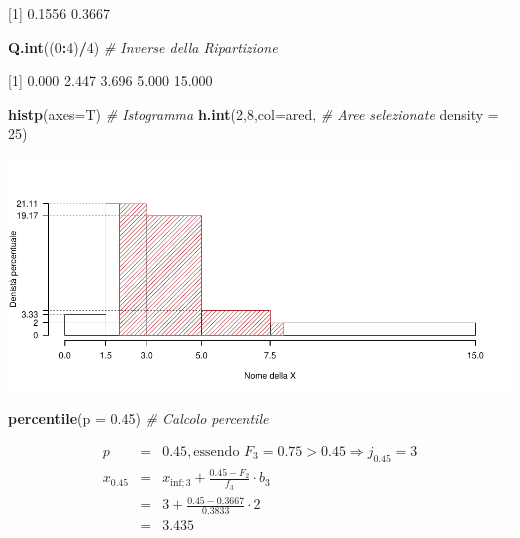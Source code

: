 \documentclass[
  11pt,
]{book}
\newenvironment{Shaded}{\begin{snugshade}}{\end{snugshade}}
\newcommand{\AttributeTok}[1]{\textcolor[rgb]{0.13,0.29,0.53}{#1}}
\newcommand{\CommentTok}[1]{\textcolor[rgb]{0.56,0.35,0.01}{\textit{#1}}}
\newcommand{\DecValTok}[1]{\textcolor[rgb]{0.00,0.00,0.81}{#1}}
\newcommand{\FloatTok}[1]{\textcolor[rgb]{0.00,0.00,0.81}{#1}}
\newcommand{\FunctionTok}[1]{\textcolor[rgb]{0.13,0.29,0.53}{\textbf{#1}}}
\newcommand{\NormalTok}[1]{#1}
\newcommand{\SpecialCharTok}[1]{\textcolor[rgb]{0.81,0.36,0.00}{\textbf{#1}}}
\theoremstyle{mytheoremstyle}
\theoremstyle{mydefstyle}
\begin{document}
{[}1{]} 0.1556 0.3667

\begin{Shaded}
\begin{Highlighting}[]
\FunctionTok{Q.int}\NormalTok{((}\DecValTok{0}\SpecialCharTok{:}\DecValTok{4}\NormalTok{)}\SpecialCharTok{/}\DecValTok{4}\NormalTok{)        }\CommentTok{\# Inverse della Ripartizione}
\end{Highlighting}
\end{Shaded}

{[}1{]} 0.000 2.447 3.696 5.000 15.000

\begin{Shaded}
\begin{Highlighting}[]
\FunctionTok{histp}\NormalTok{(}\AttributeTok{axes=}\NormalTok{T)         }\CommentTok{\# Istogramma}
\FunctionTok{h.int}\NormalTok{(}\DecValTok{2}\NormalTok{,}\DecValTok{8}\NormalTok{,}\AttributeTok{col=}\NormalTok{ared,   }\CommentTok{\# Aree selezionate}
      \AttributeTok{density =} \DecValTok{25}\NormalTok{)   }
\end{Highlighting}
\end{Shaded}

\begin{center}\includegraphics{Appunti_di_Statistica_2025_files/figure-latex/25-test-functions-2-1} \end{center}

\begin{Shaded}
\begin{Highlighting}[]
\FunctionTok{percentile}\NormalTok{(}\AttributeTok{p =} \FloatTok{0.45}\NormalTok{)       }\CommentTok{\# Calcolo percentile}
\end{Highlighting}
\end{Shaded}

\begin{eqnarray*}
  p &=&  0.45 , \text{essendo }F_{ 3 }= 0.75  > 0.45  \Rightarrow j_{ 0.45 }= 3 \\
  x_{ 0.45 } &=& x_{\text{inf}; 3 } + \frac{ { 0.45 } - F_{ 2 }} {f_{ 3 }} \cdot b_{ 3 } \\
            &=&  3  + \frac {{ 0.45 } -  0.3667 } { 0.3833 } \cdot  2  \\
            &=&  3.435 
\end{eqnarray*}
\end{document}

